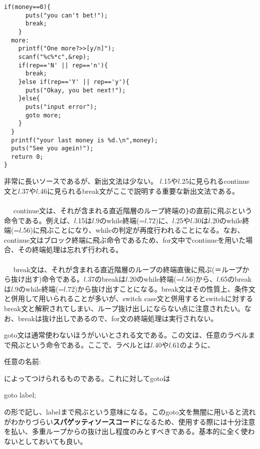 \begin{boxnote}
\addtocounter{lstlisting}{-1}
\begin{lstlisting}[caption=ハイ\&ロー(続き),firstnumber=57]
    if(money==0){
      puts("you can't bet!");
      break;
    }
  more:
    printf("One more?>>[y/n]");
    scanf("%c%*c",&rep);
    if(rep=='N' || rep=='n'){
      break;
    }else if(rep=='Y' || rep=='y'){
      puts("Okay, you bet next!");
    }else{
      puts("input error");
      goto more;
    }
  }
  printf("your last money is %d.\n",money);
  puts("See you agein!");
  return 0;
}
\end{lstlisting}
\end{boxnote}
非常に長いソースであるが、新出文法は少ない。
$l$.15や$l$.25に見られるcontinue文と$l$.37や$l$.46に見られるbreak文がここで説明する重要な新出文法である。
\\ \\　
continue文は、それが含まれる直近階層のループ終端の\verb|}|の直前に飛ぶという命令である。例えば、$l$.15は$l$.9のwhile終端(=$l$.72)に、$l$.25や$l$.30は$l$.20のwhile終端(=$l$.56)に飛ぶことになり、whileの判定が再度行われることになる。なお、continue文はブロック終端に飛ぶ命令であるため、for文中でcontinueを用いた場合、その終端処理は忘れず行われる。
\\ \\　
break文は、それが含まれる直近階層のループの終端直後に飛ぶ(＝ループから抜け出す)命令である。$l$.37のbreakは$l$.20のwhile終端(=$l$.56)から、$l$.65のbreakは$l$.9のwhile終端(=$l$.72)から抜け出すことになる。break文はその性質上、条件文と併用して用いられることが多いが、switch case文と併用するとswitchに対するbreak文と解釈されてしまい、ループ抜け出しにならない点に注意されたい。なお、breakは抜け出しであるので、for文の終端処理は実行されない。

goto文は通常使わないほうがいいとされる文である。この文は、任意のラベルまで飛ぶという命令である。ここで、ラベルとは$l$.40や$l$.61のように、
\begin{code}
任意の名前:
\end{code}
によってつけられるものである。これに対してgotoは
\begin{code}
goto label;
\end{code}
の形で記し、labelまで飛ぶという意味になる。このgoto文を無闇に用いると流れがわかりづらい\textbf{スパゲッティソースコード}になるため、使用する際には十分注意を払い、多重ループからの抜け出し程度のみとすべきである。基本的に全く使わないとしておいても良い。

